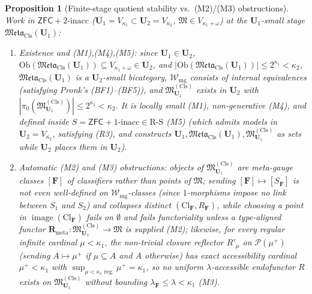 \documentclass[11pt]{article}
\theoremstyle{plain}
\newtheorem{proposition}[theorem]{Proposition}
\theoremstyle{definition}
\newcommand{\RS}{\mathrm{R\text{-}S}}
\newcommand{\fM}{\mathfrak{M}}
\newcommand{\Meta}{\mathfrak{Meta}}
\newcommand{\Ob}{\mathrm{Ob}}
\newcommand{\Cl}{\mathrm{Cl}}
\newcommand{\ZFC}{\mathsf{ZFC}}
\DeclareMathOperator{\image}{image}
\begin{document}
\begin{proposition}[Finite-stage quotient stability vs.\ \textup{(M2)/(M3)} obstructions]\label{prop:meta-quotient-finite}
Work in $\ZFC + 2\text{-inacc}$ ($\mathbf{U}_1 = V_{\kappa_1} \subset \mathbf{U}_2 = V_{\kappa_2}$, $\fM \in V_{\kappa_1 + \omega}$) at the $\mathbf{U}_1$-small stage $\Meta_{\mathrm{Cls}}(\mathbf{U}_1)$:
\begin{enumerate}[nosep,label=(\roman*)]
\item \emph{Existence and \textup{(M1),(M4),(M5)}}: since $\mathbf{U}_1 \in \mathbf{U}_2$, $\Ob(\Meta_{\mathrm{Cls}}(\mathbf{U}_1)) \subseteq V_{\kappa_1+\omega} \in \mathbf{U}_2$, and $|\Ob(\Meta_{\mathrm{Cls}}(\mathbf{U}_1))| \le 2^{\kappa_1} < \kappa_2$, $\Meta_{\mathrm{Cls}}(\mathbf{U}_1)$ is a $\mathbf{U}_2$-small bicategory, $\mathcal{W}_{\mathrm{mg}}$ consists of internal equivalences (satisfying Pronk's \textup{(BF1)--(BF5)}), and $\fM^{(\mathrm{Cls})}_{\mathbf{U}_1}$ exists in $\mathbf{U}_2$ with $|\pi_0(\fM^{(\mathrm{Cls})}_{\mathbf{U}_1})| \le 2^{\kappa_1} < \kappa_2$. It is locally small \textup{(M1)}, non-generative \textup{(M4)}, and defined inside $S = \ZFC + 1\text{-inacc} \in \RS$ \textup{(M5)} (which admits models in $\mathbf{U}_2 = V_{\kappa_2}$, satisfying \textup{(R3)}, and constructs $\mathbf{U}_1, \Meta_{\mathrm{Cls}}(\mathbf{U}_1), \fM^{(\mathrm{Cls})}_{\mathbf{U}_1}$ as sets while $\mathbf{U}_2$ places them in $\mathbf{U}_2$).
\item \emph{Automatic \textup{(M2)} and \textup{(M3)} obstructions}: objects of $\fM^{(\mathrm{Cls})}_{\mathbf{U}_1}$ are meta-gauge classes $[\mathbf{F}]$ of classifiers rather than points of $\fM$; sending $[\mathbf{F}] \mapsto [S_{\mathbf{F}}]$ is not even well-defined on $\mathcal{W}_{\mathrm{mg}}$-classes (since $1$-morphisms impose no link between $S_1$ and $S_2$) and collapses distinct $(\Cl_{\mathbf{F}}, R_{\mathbf{F}})$, while choosing a point in $\image(\Cl_{\mathbf{F}})$ fails on $\emptyset$ and fails functoriality unless a type-aligned functor $\mathbf{R}_{\mathrm{meta}} : \fM^{(\mathrm{Cls})}_{\mathbf{U}_1} \to \fM$ is supplied \textup{(M2)}; likewise, for every regular infinite cardinal $\mu < \kappa_1$, the non-trivial closure reflector $R'_\mu$ on $\mathcal{P}(\mu^+)$ (sending $A \mapsto \mu^+$ if $\mu \subseteq A$ and $A$ otherwise) has exact accessibility cardinal $\mu^+ < \kappa_1$ with $\sup_{\mu < \kappa_1\text{ reg.}} \mu^+ = \kappa_1$, so no uniform $\lambda$-accessible endofunctor $R$ exists on $\fM^{(\mathrm{Cls})}_{\mathbf{U}_1}$ without bounding $\lambda_{\mathbf{F}} \le \lambda < \kappa_1$ \textup{(M3)}.
\end{enumerate}
\end{proposition}
\end{document}

